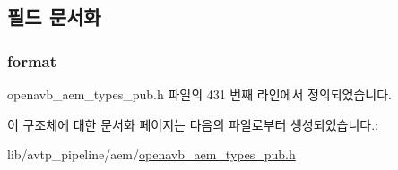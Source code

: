 \subsection{필드 문서화}
\subsubsection[{\texorpdfstring{format}{format}}]{ format}\hypertarget{structopenavb__aem__stream__format__avtp__video__t_a37f3210787a8b11a8f8811f7cf167fdf}{}\label{structopenavb__aem__stream__format__avtp__video__t_a37f3210787a8b11a8f8811f7cf167fdf}


openavb\+\_\+aem\+\_\+types\+\_\+pub.\+h 파일의 431 번째 라인에서 정의되었습니다.



이 구조체에 대한 문서화 페이지는 다음의 파일로부터 생성되었습니다.\+:\begin{DoxyCompactItemize}
\item 
lib/avtp\+\_\+pipeline/aem/\hyperlink{openavb__aem__types__pub_8h}{openavb\+\_\+aem\+\_\+types\+\_\+pub.\+h}\end{DoxyCompactItemize}
